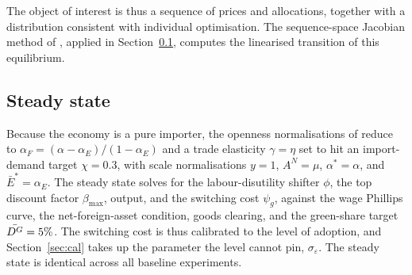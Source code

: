The object of interest is thus a sequence of prices and allocations, together
with a distribution consistent with individual optimisation. The sequence-space Jacobian
method of \citet{Auclert2021a}, applied in Section~\ref{sec:ss}, computes the
linearised transition of this equilibrium.

\subsection{Steady state}\label{sec:ss}

Because the economy is a pure importer, the openness normalisations of \citet{auclert2023energy} reduce to
$\alpha_F=(\alpha-\alpha_E)/(1-\alpha_E)$ and a trade elasticity $\gamma=\eta$ set
to hit an import-demand target $\chi=0.3$, with scale normalisations $y=1$,
$A^N=\mu$, $\alpha^{*}=\alpha$, and $\bar E^{*}=\alpha_E$. The steady
state solves for the labour-disutility shifter $\phi$, the top discount factor
$\beta_{\max}$, output, and the switching cost $\psi_g$, against the wage Phillips
curve, the net-foreign-asset condition, goods clearing, and the green-share target
$\bar{D^{G}}=5\%$. The switching cost is thus calibrated to the level of adoption, and
Section~\ref{sec:cal} takes up the parameter the level cannot pin,
$\sigma_\varepsilon$. The steady state is identical across all baseline
experiments.
